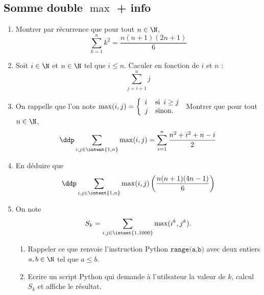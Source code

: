 \subsection{Somme double $\max$ + info}

\begin{exercice}
\begin{enumerate}
\item Montrer par récurrence que pour tout $n\in \N$, 
$$ \sum_{k=1}^n  k^2= \frac{n(n+1)(2n+1)}{6}$$

\item Soit $i\in \N$ et $n\in \N$ tel que $i\leq n$. Caculer en fonction de $i$ et $n$ :
$$\sum_{j=i+1}^n j$$

\item 
On rappelle que l'on note $\max(i,j) =  \left\{
    \begin{array}{ll}
       i & \text{si\, } i \geq j \\
        j & \mbox{sinon.}
    \end{array}
\right.
$
Montrer que pour tout $n\in \N$, $$\ddp \sum_{i,j\in \intent{1,n}} \max(i,j)  = \sum_{i=1}^n \frac{n^2+i^2 +n-i}{2}$$ 
\item En déduire que 
$$\ddp \sum_{i,j\in \intent{1,n}} \max(i,j) \left(   \frac{n(n+1)(4n-1)}{6} \right)	 $$

\item On note $$S_k =  \sum_{i,j\in \intent{1,1000}} \max(i^k,j^k).$$ 
\begin{enumerate}
\item Rappeler ce que renvoie l'instruction Python $\texttt{range(a,b)}$ avec deux entiers $a,b\in \N$ tel que $a\leq b$.
\item Ecrire un script Python qui demande à l'utilsateur la valeur de $k$, calcul $S_k$ et affiche le résultat. 
\end{enumerate}
\end{enumerate}
\end{exercice}




